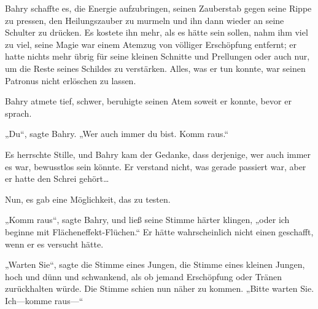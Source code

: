 Bahry schaffte es, die Energie aufzubringen, seinen Zauberstab gegen seine Rippe zu pressen, den Heilungszauber zu murmeln und ihn dann wieder an seine Schulter zu drücken. Es kostete ihn mehr, als es hätte sein sollen, nahm ihm viel zu viel, seine Magie war einem Atemzug von völliger Erschöpfung entfernt; er hatte nichts mehr übrig für seine kleinen Schnitte und Prellungen oder auch nur, um die Reste seines Schildes zu verstärken. Alles, was er tun konnte, war seinen Patronus nicht erlöschen zu lassen.

Bahry atmete tief, schwer, beruhigte seinen Atem soweit er konnte, bevor er sprach.

„Du“, sagte Bahry. „Wer auch immer du bist. Komm raus.“

Es herrschte Stille, und Bahry kam der Gedanke, dass derjenige, wer auch immer es war, bewusstlos sein könnte. Er verstand nicht, was gerade passiert war, aber er hatte den Schrei gehört…

Nun, es gab eine Möglichkeit, das zu testen.

„Komm raus“, sagte Bahry, und ließ seine Stimme härter klingen, „oder ich beginne mit Flächeneffekt-Flüchen.“ Er hätte wahrscheinlich nicht einen geschafft, wenn er es versucht hätte.

„Warten Sie“, sagte die Stimme eines Jungen, die Stimme eines kleinen Jungen, hoch und dünn und schwankend, als ob jemand Erschöpfung oder Tränen zurückhalten würde. Die Stimme schien nun näher zu kommen. „Bitte warten Sie. Ich—komme raus—“

